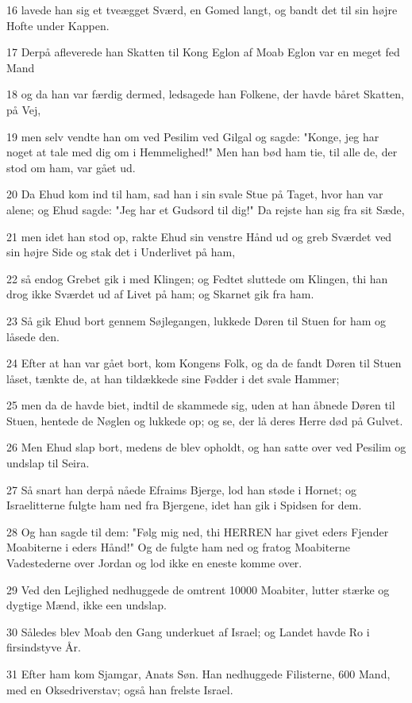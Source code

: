 \par 16 lavede han sig et tveægget Sværd, en Gomed langt, og bandt det til sin højre Hofte under Kappen.
\par 17 Derpå afleverede han Skatten til Kong Eglon af Moab Eglon var en meget fed Mand
\par 18 og da han var færdig dermed, ledsagede han Folkene, der havde båret Skatten, på Vej,
\par 19 men selv vendte han om ved Pesilim ved Gilgal og sagde: "Konge, jeg har noget at tale med dig om i Hemmelighed!" Men han bød ham tie, til alle de, der stod om ham, var gået ud.
\par 20 Da Ehud kom ind til ham, sad han i sin svale Stue på Taget, hvor han var alene; og Ehud sagde: "Jeg har et Gudsord til dig!" Da rejste han sig fra sit Sæde,
\par 21 men idet han stod op, rakte Ehud sin venstre Hånd ud og greb Sværdet ved sin højre Side og stak det i Underlivet på ham,
\par 22 så endog Grebet gik i med Klingen; og Fedtet sluttede om Klingen, thi han drog ikke Sværdet ud af Livet på ham; og Skarnet gik fra ham.
\par 23 Så gik Ehud bort gennem Søjlegangen, lukkede Døren til Stuen for ham og låsede den.
\par 24 Efter at han var gået bort, kom Kongens Folk, og da de fandt Døren til Stuen låset, tænkte de, at han tildækkede sine Fødder i det svale Hammer;
\par 25 men da de havde biet, indtil de skammede sig, uden at han åbnede Døren til Stuen, hentede de Nøglen og lukkede op; og se, der lå deres Herre død på Gulvet.
\par 26 Men Ehud slap bort, medens de blev opholdt, og han satte over ved Pesilim og undslap til Seira.
\par 27 Så snart han derpå nåede Efraims Bjerge, lod han støde i Hornet; og Israelitterne fulgte ham ned fra Bjergene, idet han gik i Spidsen for dem.
\par 28 Og han sagde til dem: "Følg mig ned, thi HERREN har givet eders Fjender Moabiterne i eders Hånd!" Og de fulgte ham ned og fratog Moabiterne Vadestederne over Jordan og lod ikke en eneste komme over.
\par 29 Ved den Lejlighed nedhuggede de omtrent 10000 Moabiter, lutter stærke og dygtige Mænd, ikke een undslap.
\par 30 Således blev Moab den Gang underkuet af Israel; og Landet havde Ro i firsindstyve År.
\par 31 Efter ham kom Sjamgar, Anats Søn. Han nedhuggede Filisterne, 600 Mand, med en Oksedriverstav; også han frelste Israel.

